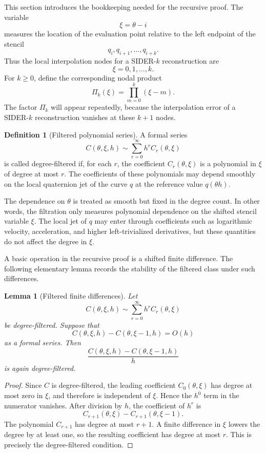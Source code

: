 \documentclass[a4paper,11pt]{article}
\numberwithin{equation}{section}
\theoremstyle{plain}
\newtheorem{lemma}[thm]{Lemma}
\theoremstyle{definition}
\newtheorem{definition}[thm]{Definition}
\theoremstyle{remark}
\begin{document}
This section introduces the bookkeeping needed for the recursive proof.  The
variable
\[
        \xi=\theta-i
\]
measures the location of the evaluation point relative to the left endpoint of
the stencil
\[
        q_i,q_{i+1},\ldots,q_{i+k}.
\]
Thus the local interpolation nodes for a SIDER-\(k\) reconstruction are
\[
        \xi=0,1,\ldots,k.
\]
For \(k\geq0\), define the corresponding nodal product
\[
        \Pi_k(\xi)=\prod_{m=0}^{k}(\xi-m).
\]
The factor \(\Pi_k\) will appear repeatedly, because the interpolation error
of a SIDER-\(k\) reconstruction vanishes at these \(k+1\) nodes.

\begin{definition}[Filtered polynomial series]
\label{def:filtered_series}
A formal series
\[
        C(\theta,\xi,h)
        \sim
        \sum_{r=0}^{\infty}h^r C_r(\theta,\xi)
\]
is called degree-filtered if, for each \(r\), the coefficient
\(C_r(\theta,\xi)\) is a polynomial in \(\xi\) of degree at most \(r\).  The
coefficients of these polynomials may depend smoothly on the local quaternion
jet of the curve \(q\) at the reference value \(q(\theta h)\).
\end{definition}

The dependence on \(\theta\) is treated as smooth but fixed in the degree
count.  In other words, the filtration only measures polynomial dependence on
the shifted stencil variable \(\xi\).  The local jet of \(q\) may enter through
coefficients such as logarithmic velocity, acceleration, and higher
left-trivialized derivatives, but these quantities do not affect the degree in
\(\xi\).

A basic operation in the recursive proof is a shifted finite difference.  The
following elementary lemma records the stability of the filtered class under
such differences.

\begin{lemma}[Filtered finite differences]
\label{lem:filtered_difference}
Let
\[
        C(\theta,\xi,h)
        \sim
        \sum_{r=0}^{\infty}h^r C_r(\theta,\xi)
\]
be degree-filtered.  Suppose that
\[
        C(\theta,\xi,h)-C(\theta,\xi-1,h)=O(h)
\]
as a formal series.  Then
\[
        \frac{C(\theta,\xi,h)-C(\theta,\xi-1,h)}{h}
\]
is again degree-filtered.
\end{lemma}

\begin{proof}
Since \(C\) is degree-filtered, the leading coefficient
\(C_0(\theta,\xi)\) has degree at most zero in \(\xi\), and therefore is
independent of \(\xi\).  Hence the \(h^0\) term in the numerator vanishes.
After division by \(h\), the coefficient of \(h^r\) is
\[
        C_{r+1}(\theta,\xi)-C_{r+1}(\theta,\xi-1).
\]
The polynomial \(C_{r+1}\) has degree at most \(r+1\).  A finite difference in
\(\xi\) lowers the degree by at least one, so the resulting coefficient has
degree at most \(r\).  This is precisely the degree-filtered condition.
\end{proof}
\end{document}
